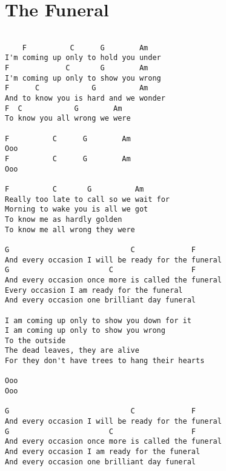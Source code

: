 \documentclass[leqno]{memoir}
\begin{document}
\chapter{The Funeral}
\begin{verbatim}

    F          C      G        Am
I'm coming up only to hold you under
F             C       G        Am
I'm coming up only to show you wrong
F      C            G          Am
And to know you is hard and we wonder
F  C            G        Am
To know you all wrong we were

F          C      G        Am
Ooo 
F          C      G        Am
Ooo

F          C       G          Am
Really too late to call so we wait for
Morning to wake you is all we got
To know me as hardly golden
To know me all wrong they were

G                            C             F
And every occasion I will be ready for the funeral
G                       C                  F
And every occasion once more is called the funeral
Every occasion I am ready for the funeral
And every occasion one brilliant day funeral

I am coming up only to show you down for it
I am coming up only to show you wrong
To the outside
The dead leaves, they are alive
For they don't have trees to hang their hearts

Ooo
Ooo

G                            C             F
And every occasion I will be ready for the funeral
G                       C                  F
And every occasion once more is called the funeral
And every occasion I am ready for the funeral
And every occasion one brilliant day funeral 
\end{verbatim}
\end{document}
